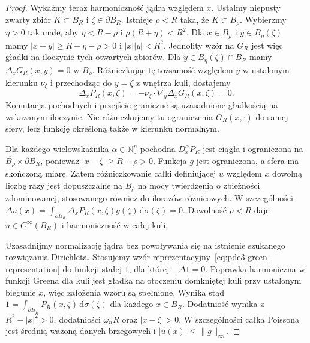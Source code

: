 \begin{proof}
Wykażmy teraz harmoniczność jądra względem $x$.
Ustalmy niepusty zwarty zbiór $K\subset B_R$ i
$\zeta\in\partial B_R$. Istnieje $\rho<R$ taka, że
$K\subset B_\rho$. Wybierzmy $\eta>0$ tak małe, aby
$\eta<R-\rho$ i $\rho(R+\eta)<R^2$.
Dla $x\in B_\rho$ i $y\in B_\eta(\zeta)$ mamy
$|x-y|\geq R-\eta-\rho>0$ i $|x||y|<R^2$.
Jednolity wzór na $G_R$ jest więc gładki na iloczynie
tych otwartych zbiorów. Dla $y\in B_\eta(\zeta)\cap B_R$
mamy $\Delta_xG_R(x,y)=0$ w $B_\rho$.
Różniczkując tę tożsamość względem $y$ w ustalonym
kierunku $\nu_\zeta$ i przechodząc do $y=\zeta$
z wnętrza kuli, dostajemy
\[
 \Delta_xP_R(x,\zeta)=
 -\nu_\zeta\cdot\nabla_y\Delta_xG_R(x,\zeta)=0.
\]
Komutacja pochodnych i przejście graniczne są
uzasadnione gładkością na wskazanym iloczynie.
Nie różniczkujemy tu ograniczenia $G_R(x,\cdot)$
do samej sfery, lecz funkcję określoną także
w kierunku normalnym.

Dla każdego wielowskaźnika $\alpha\in\mathbb N_0^n$
pochodna $D_x^\alpha P_R$ jest ciągła i ograniczona
na $\overline{B_\rho}\times\partial B_R$, ponieważ
$|x-\zeta|\geq R-\rho>0$. Funkcja $g$ jest ograniczona,
a sfera ma skończoną miarę. Zatem różniczkowanie
całki definiującej $u$ względem $x$ dowolną liczbę razy
jest dopuszczalne na $B_\rho$ na mocy twierdzenia
o zbieżności zdominowanej, stosowanego również
do ilorazów różnicowych. W szczególności
$\Delta u(x)=\int_{\partial B_R}\Delta_x P_R(x,\zeta)
g(\zeta)\,\mathrm d\sigma(\zeta)=0$.
Dowolność $\rho<R$ daje $u\in C^\infty(B_R)$
i harmoniczność w całej kuli.

Uzasadnijmy normalizację jądra bez powoływania się na
istnienie szukanego rozwiązania Dirichleta. Stosujemy
wzór reprezentacyjny~\eqref{eq:pde3-green-representation}
do funkcji stałej $1$, dla której $-\Delta1=0$.
Poprawka harmoniczna w funkcji Greena dla kuli
jest gładka na otoczeniu domkniętej kuli przy ustalonym
biegunie $x$, więc założenia wzoru są spełnione.
Wynika stąd $1=\int_{\partial B_R}P_R(x,\zeta)\,
\mathrm d\sigma(\zeta)$ dla każdego $x\in B_R$.
Dodatniość wynika z $R^2-|x|^2>0$, dodatniości
$\omega_n R$ oraz $|x-\zeta|>0$.
W szczególności całka Poissona jest średnią ważoną
danych brzegowych i $|u(x)|\leq\|g\|_\infty$.


\end{proof}
